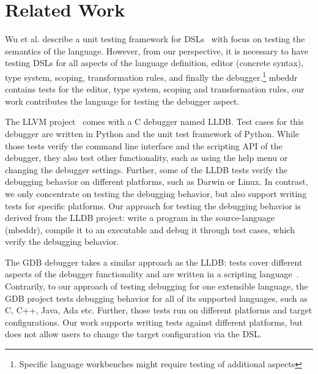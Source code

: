 \section{Related Work}

Wu et al. describe a unit testing framework for 
\acp{DSL}~\cite{DBLP:conf/dsl/WuGM09} with focus on
testing the semantics of the language.  However, from our perspective, it is
necessary to have testing \acp{DSL} for all aspects of the language definition, \eg editor
(concrete syntax), type system, scoping, transformation rules, and finally the
debugger.\footnote{Specific language workbenches might require testing of additional aspects}
mbeddr contains tests for the editor, type system, scoping and transformation
rules, our work contributes the language for testing the debugger aspect.

The \ac{LLVM} project~\cite{LLDB} comes with a C debugger named \ac{LLDB}.
Test cases for this debugger are written in Python
and the unit test framework of Python. While those tests verify the 
command line interface and the scripting \ac{API} of the debugger, they also
test other functionality, such as using the help menu or changing the debugger settings.
Further, some of the \ac{LLDB} tests verify the debugging behavior on different
platforms, such as Darwin or Linux. In contrast, we only concentrate on
testing the debugging behavior, but also support writing tests for
specific platforms. Our approach for testing the debugging behavior is
derived from the \ac{LLDB} project: write a program in the source-language
(mbeddr), compile it to an executable and debug it through test cases, which verify the
debugging behavior.

The \ac{GDB} debugger takes a similar approach as
the \ac{LLDB}: tests cover different aspects of the debugger
functionality and are written in a scripting language~\cite{gdb}.
Contrarily, to our approach of testing debugging 
for one extensible language, the \ac{GDB} project tests
debugging behavior for all of its supported languages, such as C, C++, Java, Ada
etc. Further, those tests run on different platforms and target
configurations. Our work supports writing tests against different platforms, but
does not allow users to change the target configuration via the \ac{DSL}.
